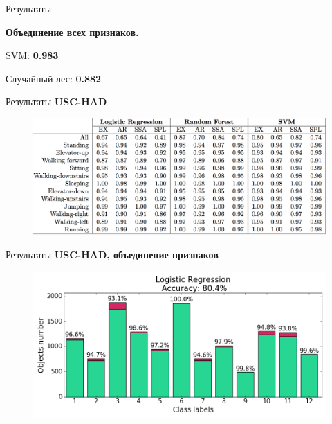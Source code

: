 \documentclass{beamer}
\begin{document}
\begin{frame}{Результаты}
\begin{minipage}[t]{0.49\columnwidth}
\begin{figure}[h]
		\end{figure}
	\end{minipage}
	\vfill
	\textbf{Объединение всех признаков.}\\
	\vspace{-0.3cm}
	\hspace{1cm}\begin{minipage}[t]{0.39\columnwidth}
		\begin{block}{}
			\centering
			SVM: \textbf{\Large 0.983} 
		\end{block}
	\end{minipage}
	\hspace{1cm}
	\begin{minipage}[t]{0.39\columnwidth}
		\begin{block}{}
			\centering
			Случайный лес: \textbf{\Large 0.882}
		\end{block}
	\end{minipage}
	
\end{frame}
\begin{frame}{Результаты}
	\textbf{\color{blue} USC-HAD}
	\begin{figure}
		\includegraphics[width=1.\linewidth]{res_numbers}
	\end{figure}
\end{frame}
\begin{frame}{Результаты}
	\textbf{\color{blue} USC-HAD, объединение признаков}
\begin{figure}[h]
	\centering
	\includegraphics[width=1.0\linewidth]{hist_uschad_lr_all}
\end{figure}
\end{frame}
\end{document}
